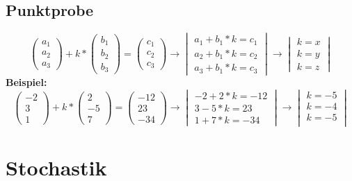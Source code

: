 \documentclass[a4paper,12pt]{article}
\begin{document}
	\subsection*{Punktprobe}
		$$
\begin{pmatrix} 
a_{1} \\
a_{2} \\
a_{3}
\end{pmatrix}+k*
\begin{pmatrix} 
b_{1} \\
b_{2} \\
b_{3}
\end{pmatrix}=
\begin{pmatrix} 
c_{1} \\
c_{2} \\
c_{3}
\end{pmatrix} \rightarrow
\begin{vmatrix}
a_{1}+b_{1}*k=c_{1} \\
a_{2}+b_{1}*k=c_{2} \\
a_{3}+b_{1}*k=c_{3}
\end{vmatrix} \rightarrow
\begin{vmatrix}
k=x \\
k=y \\
k=z
\end{vmatrix}
$$
		\textbf{Beispiel:}
			$$
\begin{pmatrix} 
-2 \\
3 \\
1
\end{pmatrix}+k*
\begin{pmatrix} 
2 \\
-5 \\
7
\end{pmatrix}=
\begin{pmatrix} 
-12 \\
23 \\
-34
\end{pmatrix} \rightarrow
\begin{vmatrix}
-2+2*k=-12\\
3-5*k=23\\
1+7*k=-34
\end{vmatrix} \rightarrow
\begin{vmatrix}
k=-5 \\
k=-4 \\
k=-5 \\
\end{vmatrix}
$$
\section*{Stochastik}
\end{document}
